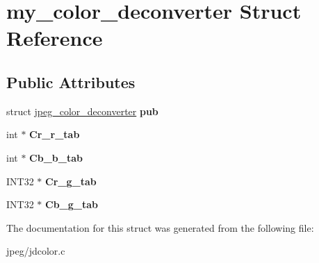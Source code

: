 \hypertarget{structmy__color__deconverter}{}\section{my\+\_\+color\+\_\+deconverter Struct Reference}
\label{structmy__color__deconverter}
\subsection*{Public Attributes}
\begin{DoxyCompactItemize}
\item 
struct \hyperlink{structjpeg__color__deconverter}{jpeg\+\_\+color\+\_\+deconverter} {\bfseries pub}\hypertarget{structmy__color__deconverter_a54bf241de985ca2e06da2bbee14e745a}{}\label{structmy__color__deconverter_a54bf241de985ca2e06da2bbee14e745a}

\item 
int $\ast$ {\bfseries Cr\+\_\+r\+\_\+tab}\hypertarget{structmy__color__deconverter_a25c4ee8d1066262c23a8181758eb0231}{}\label{structmy__color__deconverter_a25c4ee8d1066262c23a8181758eb0231}

\item 
int $\ast$ {\bfseries Cb\+\_\+b\+\_\+tab}\hypertarget{structmy__color__deconverter_aa40b60773afd04e0b076f83ed00069c9}{}\label{structmy__color__deconverter_aa40b60773afd04e0b076f83ed00069c9}

\item 
I\+N\+T32 $\ast$ {\bfseries Cr\+\_\+g\+\_\+tab}\hypertarget{structmy__color__deconverter_ab44aebbe0bd6d32aec678c71f7758bfc}{}\label{structmy__color__deconverter_ab44aebbe0bd6d32aec678c71f7758bfc}

\item 
I\+N\+T32 $\ast$ {\bfseries Cb\+\_\+g\+\_\+tab}\hypertarget{structmy__color__deconverter_abb16c33e195531366787333d6b7a2ef6}{}\label{structmy__color__deconverter_abb16c33e195531366787333d6b7a2ef6}

\end{DoxyCompactItemize}


The documentation for this struct was generated from the following file\+:\begin{DoxyCompactItemize}
\item 
jpeg/jdcolor.\+c\end{DoxyCompactItemize}
